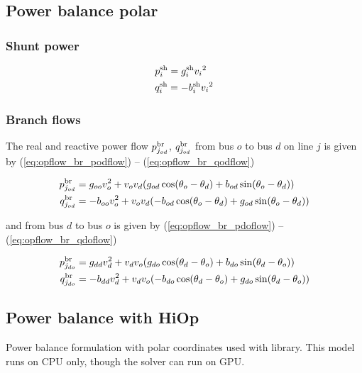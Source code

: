 \subsection{Power balance polar}

\subsubsection{Shunt power}
\begin{align}
&p^{\text{sh}}_i = g^\text{sh}_i{v_i}^2 \label{eq:opflow_sh_p} \\
&q^{\text{sh}}_i = -b^\text{sh}_i{v_i}^2 \label{eq:opflow_sh_q}
\end{align}

\subsubsection{Branch flows}
The real and reactive power flow $p^\text{br}_{j_{od}}$, $q^\text{br}_{j_{od}}$  from bus $o$ to bus $d$ on line $j$ is given by (\ref{eq:opflow_br_podflow}) -- 
 (\ref{eq:opflow_br_qodflow})


\begin{align}
p^\text{br}_{j_{od}} &= g_{oo}{v^2_o} + v_ov_d(g_{od}\cos(\theta_o - \theta_d) + b_{od}\sin(\theta_o - \theta_d)) \label{eq:opflow_br_podflow}\\
q^\text{br}_{j_{od}} &= -b_{oo}{v^2_o} + v_ov_d(-b_{od}\cos(\theta_o - \theta_d) + g_{od}\sin(\theta_o - \theta_d)) \label{eq:opflow_br_qodflow}
\end{align}

and from bus $d$ to bus $o$ is given by (\ref{eq:opflow_br_pdoflow}) -- (\ref{eq:opflow_br_qdoflow})

\begin{align}
p^\text{br}_{j_{do}} &= g_{dd}{v^2_d} + v_dv_o(g_{do}\cos(\theta_d - \theta_o) + b_{do}\sin(\theta_d - \theta_o))  \label{eq:opflow_br_pdoflow} \\
q^\text{br}_{j_{do}} &= -b_{dd}{v^2_d} + v_dv_o(-b_{do}\cos(\theta_d - \theta_o) + g_{do}\sin(\theta_d - \theta_o)) \label{eq:opflow_br_qdoflow}
\end{align}

\begin{comment}
\subsection{Power balance cartesian}
\end{comment}

\subsection{Power balance with HiOp}
Power balance formulation with polar coordinates used with \hiop \cite{hiop-manual} library. This model runs on CPU only, though the \hiop solver can run on GPU.

